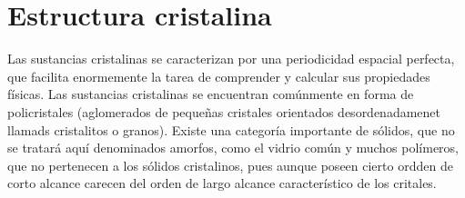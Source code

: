 \chapter{Estructura cristalina}

Las sustancias cristalinas se caracterizan por una periodicidad espacial perfecta, que facilita enormemente la tarea de comprender y calcular sus propiedades físicas. Las sustancias cristalinas se encuentran comúnmente en forma de policristales (aglomerados de pequeñas cristales orientados desordenadamenet llamads cristalitos o granos). Existe una categoría importante de sólidos, que no se tratará aquí denominados amorfos, como el vidrio común  y muchos polímeros, que no pertenecen a los sólidos cristalinos, pues aunque poseen cierto ordden de corto alcance carecen del orden de largo alcance característico de los critales.
